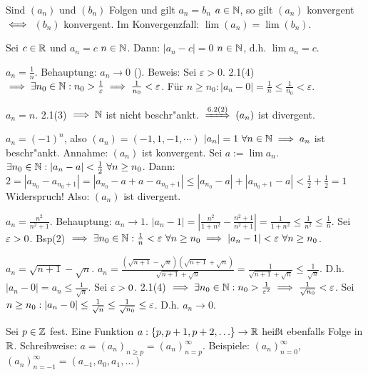 \documentclass[a4paper,twoside,DIV15,BCOR12mm]{scrbook}
\begin{document}
\begin{bemerkung}
Sind $(a_n)$ und $(b_n)$ Folgen und gilt $a_n = b_n$ \ffa $a\in\mathbb{N}$, so gilt $(a_n)$ konvergent $\iff$ $(b_n)$ konvergent. Im Konvergenzfall: $\lim(a_n) = \lim(b_n)$.
\end{bemerkung}

\begin{beispiele}
\item Sei $c \in \mathbb{R}$ und $a_n = c$ \ffa $n\in\mathbb{N}$. Dann: $|a_n - c| =0$ \ffa $n\in\mathbb{N}$, d.h. $\lim{a_n} = c$.
\item $a_n = \frac{1}{n}$. Behauptung: $a_n \to 0$ (). Beweis: Sei $\varepsilon > 0$. 2.1(4) $\implies \exists n_0 \in \mathbb{N}: n_0 > \frac{1}\varepsilon \implies \frac{1}{n_0} < \varepsilon$. Für $n \ge n_0: |a_n - 0| = \frac{1}{n} \le \frac{1}{n_0} < \varepsilon$.
\item $a_n = n$. 2.1(3) $\implies \mathbb{N}$ ist nicht beschr"ankt. $\folgtnach{6.2(2)} (a_n)$ ist divergent.
\item $a_n = (-1)^n$, also $(a_n) = (-1, 1, -1, \cdots)$ $|a_n|=1 \ \forall n\in\mathbb{N} \implies a_n$ ist beschr"ankt. Annahme: $(a_n)$ ist konvergent. Sei $a:=\lim a_n$. $\exists n_0\in\mathbb{N} : |a_n - a| < \frac{1}{2}\ \forall n \ge n_0$. Dann: $2=|a_{n_0}-a_{n_0+1}|=|a_{n_0}-a+a-a_{n_0+1}|\le|a_{n_0}-a|+|a_{n_0+1}-a|<\frac{1}{2} + \frac{1}{2}=1$ Widerspruch! Also: $(a_n)$ ist divergent.
\item $a_n = \frac{n^2}{n^2 + 1}$. Behauptung: $a_n \to 1$. $|a_n-1|=|\frac{n^2}{1+n^2}-\frac{n^2+1}{n^2+1}|=\frac{1}{1+n^2}\le\frac{1}{n^2}\le\frac{1}{n}$. Sei $\varepsilon>0$. Bsp(2) $\folgt \exists n_0 \in \MdN: \frac{1}{n}<\ep\ \forall n \ge n_0 \folgt |a_n-1|<\ep\ \forall n\ge n_0$.
\item $a_n = \sqrt{n+1}-\sqrt{n}$. $a_n = \frac{(\sqrt{n+1}-\sqrt{n})(\sqrt{n+1}+\sqrt{n})}{\sqrt{n+1}+\sqrt{n}}=\frac{1}{\sqrt{n+1}+\sqrt{n}}\le\frac{1}{\sqrt{n}}$. D.h. $|a_n-0|=a_n\le\frac{1}{\sqrt{n}}$. Sei $\varepsilon>0$. 2.1(4) $\implies \exists n_0\in\mathbb{N}: n_0>\frac{1}{{\varepsilon}^2}\implies\frac{1}{\sqrt{n_0}}<\varepsilon$. Sei $n \ge n_0: |a_n-0| \le \frac{1}{\sqrt{n}} \le \frac{1}{\sqrt{n_0}} \le \varepsilon$. D.h. $a_n \to 0$.
\end{beispiele}

\begin{bemerkung}
Sei $p\in\mathbb{Z}$ fest. Eine Funktion $a:\{p,p+1,p+2,\ldots\} \to \mathbb{R}$ heißt ebenfalls Folge in $\mathbb{R}$. Schreibweise: $a = (a_n)_{n\ge p} = (a_n)_{n = p}^\infty$. Beispiele: $(a_n)_{n=0}^\infty$, $(a_n)_{n=-1}^\infty = (a_{-1}, a_0, a_1, \ldots)$
\end{bemerkung}
\end{document}
